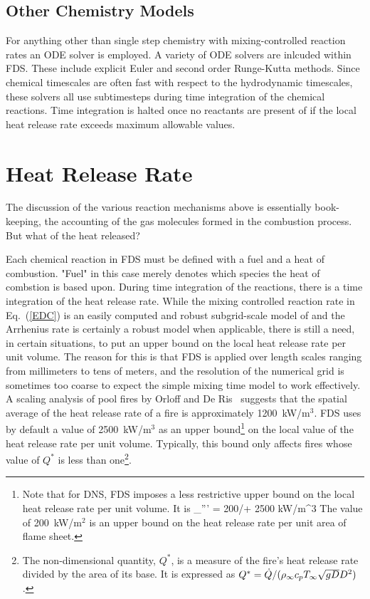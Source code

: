 \subsection{Other Chemistry Models}

For anything other than single step chemistry with mixing-controlled reaction rates an ODE solver is employed.  A variety of ODE solvers are inlcuded within FDS.  These include explicit Euler and second order Runge-Kutta methods.  Since chemical timescales are often fast with respect to the hydrodynamic timescales, these solvers all use subtimesteps during time integration of the chemical reactions.  Time integration is halted once no reactants are present of if the local heat release rate exceeds maximum allowable values.


\section{Heat Release Rate}

The discussion of the various reaction mechanisms above is essentially book-keeping, the accounting of the gas
molecules formed in the combustion process. But what of the heat released?

Each chemical reaction in FDS must be defined with a fuel and a heat of combustion.  "Fuel" in this case merely denotes which species the heat of combstion is based upon.  During time integration of the reactions, there is a time integration of the heat release rate.  While the mixing controlled reaction rate  in Eq.~(\ref{EDC}) is an easily computed and robust subgrid-scale model of and the Arrhenius rate is certainly a robust model when applicable, there is still a need, in certain situations, to put an upper bound on the local heat release rate per unit volume. The reason for
this is that FDS is applied over length scales ranging from millimeters to tens of meters, and the resolution of the numerical grid
is sometimes too coarse to expect the simple mixing time model to work effectively.
A scaling analysis of pool fires by Orloff and De Ris~\cite{Orloff:19th_Symposium} suggests that the spatial average of the
heat release rate of a fire is approximately 1200~kW/m$^3$. FDS uses by default a value of 2500~kW/m$^3$ as an upper bound\footnote{Note that
for DNS, FDS imposes a less restrictive upper bound on the local heat release rate per unit volume. It is
\be \dq_{\max}''' = 200/\dx + 2500 \quad \hbox{kW/m}^3 \ee
The value of 200~kW/m$^2$ is an upper bound on the heat release rate per unit area of flame sheet.}
on the local value of the heat release rate per unit volume. Typically, this bound only affects fires whose value of $Q^*$
is less than one\footnote{The non-dimensional quantity, $Q^*$, is a measure of the fire's heat release rate divided by the
area of its base. It is expressed as $Q^*=\dot{Q}/(\rho_\infty c_p T_\infty \sqrt{g D} D^2)$.}.

